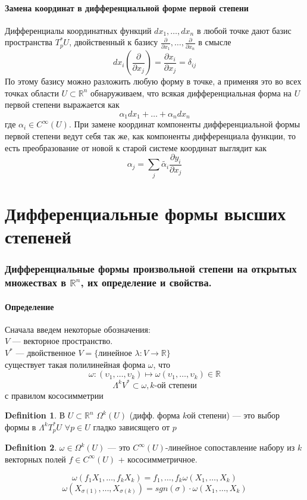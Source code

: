 \documentclass[a4paper,12pt]{article} %
\theoremstyle{definition}
\newtheorem{definition}{Definition}[section]
\begin{document}
\subsection{Замена координат в дифференциальной форме первой степени}
Дифференциалы координатных функций $dx_1,\dots,dx_n$ в любой точке дают базис пространства $T^*_p U$, двойственный к базису $\frac{\partial}{\partial x_1}, \dots, \frac{\partial}{\partial x_n}$ в смысле
\begin{equation}
	dx_i \left( \frac{\partial}{\partial x_j} \right) = \frac{\partial x_i}{\partial x_j} = \delta_{ij}
\end{equation}
По этому базису можно разложить любую форму в точке, а применяя это во всех точках области $U\subset \mathbb{R}^n$ обнаруживаем, что всякая дифференциальная форма на $U$ первой степени выражается как
\begin{equation}
	\alpha_1 d x_1 + \dots + \alpha_n dx_n
\end{equation}
где $\alpha_i \in C^{\infty}(U)$. При замене координат компоненты дифференциальной формы первой степени ведут себя так же, как компоненты дифференциала функции, то есть преобразование от новой к старой системе координат выглядит как
\begin{equation}
	\alpha_j = \sum_j \widetilde{\alpha_i} \frac{\partial y_i}{\partial x_j}
\end{equation}
\part{Дифференциальные формы высших степеней}
\section{Дифференциальные формы произвольной степени на открытых множествах в $\mathbb{R}^n$, их определение и свойства.}
\subsection{Определение}
Сначала введем некоторые обозначения:\\
$V$ --- векторное пространство.\\
$V^*$ --- двойственное $V = \bigl\{ \text{линейное } \lambda : V \rightarrow \mathbb{R} \bigl\}$\\
существует такая полилинейная форма $\omega$, что 
$$\omega : (\upsilon_1, \dots, \upsilon_k)  \mapsto \omega  (\upsilon_1, \dots, \upsilon_k) \in \mathbb{R}$$
$$\Lambda^kV^* \subset \omega, k\text{-ой степени}$$
с правилом кососимметрии
\begin{definition}
	В $U \subset \mathbb{R}^n$ $\Omega^k(U)$ (дифф. форма $k$ой степени) --- это выбор формы в $\Lambda^k T_p^* U$ $\forall p \in U$ гладко зависящего от $p$
\end{definition}
\begin{definition}
	$\omega \in \Omega^k(U)$ --- это $C^{\infty}(U)$-линейное сопоставление набору из $k$ векторных полей $f \in C^{\infty}(U)$ + кососимметричное.
\end{definition}
$$\omega (f_1 X_1, \dots, f_k X_k) = f_1,\dots, f_k\omega(X_1, \dots, X_k)$$
$$\omega(X_{\sigma(1)}, \dots, X_{\sigma(k)}) = sgn(\sigma) \cdot \omega (X_1, \dots, X_k)$$
\end{document}
